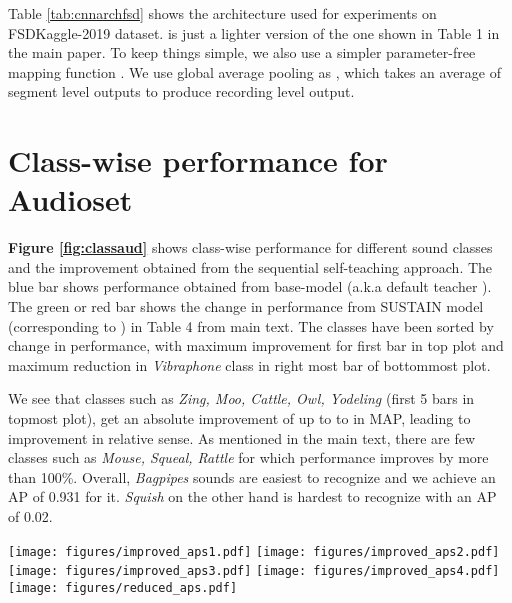 \documentclass{article}
\begin{document}
Table \ref{tab:cnnarchfsd} shows the  architecture used for experiments on FSDKaggle-2019 dataset.  is just a lighter version of the one shown in Table 1 in the main paper. To keep things simple, we also use a simpler parameter-free mapping function . We use global average pooling as , which takes an average of segment level outputs to produce recording level output. 


\section{Class-wise performance for Audioset}
\textbf{Figure \ref{fig:classaud}} shows class-wise performance for different sound classes and the improvement obtained from the sequential self-teaching approach.  The blue bar shows performance obtained from base-model (a.k.a default teacher ). The green or red bar shows the change in performance from SUSTAIN model (corresponding to ) in Table 4 from main text. The classes have been sorted by change in performance, with maximum improvement for first bar in top plot and maximum reduction in \emph{Vibraphone} class in right most bar of bottommost plot. 

We see that classes such as \emph{Zing, Moo, Cattle, Owl, Yodeling} (first 5 bars in topmost plot), get an absolute improvement of up to  to  in MAP, leading to  improvement in relative sense. As mentioned in the main text, there are few classes such as \emph{Mouse, Squeal, Rattle} for which performance improves by more than 100\%. Overall, \emph{Bagpipes} sounds are easiest to recognize and we achieve an AP of 0.931 for it. \emph{Squish} on the other hand is hardest to recognize with an AP of 0.02.











\begin{figure*}[t]
      \centering
      \texttt{[image: figures/improved\_aps1.pdf]}
      \texttt{[image: figures/improved\_aps2.pdf]}
      \texttt{[image: figures/improved\_aps3.pdf]}
      \texttt{[image: figures/improved\_aps4.pdf]}
      \texttt{[image: figures/reduced\_aps.pdf]}
    \caption{\textbf{Audioset} Class-wise AP and improvement in AP from SUSTAIN. The blue bar shows performance of , i.e. model trained only on available labels. The bar on top of each blue bar shows improvement (green) or deterioration (red) in performance from sequential teaching. Several classes (along with \textbf{absolute change} in performance ) have been annotated to bring out noteworthy observations. }\label{fig:classaud}
\end{figure*}
\end{document}
